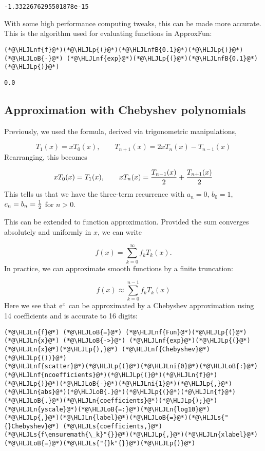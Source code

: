 \documentclass[12pt,a4paper]{article}
\newcommand{\HLJLn}[1]{#1}
\newcommand{\HLJLnf}[1]{\textcolor[RGB]{66,102,213}{#1}}
\newcommand{\HLJLs}[1]{\textcolor[RGB]{201,61,57}{#1}}
\newcommand{\HLJLnfB}[1]{\textcolor[RGB]{59,151,46}{#1}}
\newcommand{\HLJLni}[1]{\textcolor[RGB]{59,151,46}{#1}}
\newcommand{\HLJLoB}[1]{\textcolor[RGB]{102,102,102}{\textbf{#1}}}
\newcommand{\HLJLp}[1]{#1}
\def\E{ {\rm e} }
\begin{document}
\begin{lstlisting}
-1.3322676295501878e-15
\end{lstlisting}


With some high performance computing tweaks, this can be made more accurate. This is the algorithm used for evaluating functions in ApproxFun:


\begin{lstlisting}
(*@\HLJLnf{f}@*)(*@\HLJLp{(}@*)(*@\HLJLnfB{0.1}@*)(*@\HLJLp{)}@*) (*@\HLJLoB{-}@*) (*@\HLJLnf{exp}@*)(*@\HLJLp{(}@*)(*@\HLJLnfB{0.1}@*)(*@\HLJLp{)}@*)
\end{lstlisting}

\begin{lstlisting}
0.0
\end{lstlisting}


\subsection{Approximation with Chebyshev polynomials}
Previously, we used the formula, derived via trigonometric manipulations,

\[
T_1(x) = x T_0(x), \qquad
T_{n+1}(x) = 2x T_n(x) - T_{n-1}(x)
\]
Rearranging, this becomes

\[
 x T_0(x) = T_1(x), \qquad
x T_n(x)  =  {T_{n-1}(x) \over 2} + {T_{n+1}(x) \over 2}
\]
This tells us that we have the three-term recurrence with $a_n = 0$, $b_0 = 1$, $c_n = b_n = {1 \over 2}$ for $n > 0$.

This can be extended to function approximation. Provided the sum converges absolutely and uniformly in $x$, we can write

\[
f(x) = \sum_{k=0}^\infty f_k T_k(x).
\]
In practice, we can approximate smooth functions by a finite truncation:

\[
f(x) \approx \sum_{k=0}^{n-1} f_k T_k(x)
\]
Here we see that $\E^x$ can be approximated by a Chebyshev approximation using 14 coefficients and is accurate to 16 digits:


\begin{lstlisting}
(*@\HLJLn{f}@*) (*@\HLJLoB{=}@*) (*@\HLJLnf{Fun}@*)(*@\HLJLp{(}@*)(*@\HLJLn{x}@*) (*@\HLJLoB{->}@*) (*@\HLJLnf{exp}@*)(*@\HLJLp{(}@*)(*@\HLJLn{x}@*)(*@\HLJLp{),}@*) (*@\HLJLnf{Chebyshev}@*)(*@\HLJLp{())}@*)
(*@\HLJLnf{scatter}@*)(*@\HLJLp{(}@*)(*@\HLJLni{0}@*)(*@\HLJLoB{:}@*)(*@\HLJLnf{ncoefficients}@*)(*@\HLJLp{(}@*)(*@\HLJLn{f}@*)(*@\HLJLp{)}@*)(*@\HLJLoB{-}@*)(*@\HLJLni{1}@*)(*@\HLJLp{,}@*)(*@\HLJLn{abs}@*)(*@\HLJLoB{.}@*)(*@\HLJLp{(}@*)(*@\HLJLn{f}@*)(*@\HLJLoB{.}@*)(*@\HLJLn{coefficients}@*)(*@\HLJLp{);}@*)(*@\HLJLn{yscale}@*)(*@\HLJLoB{=:}@*)(*@\HLJLn{log10}@*)(*@\HLJLp{,}@*)(*@\HLJLn{label}@*)(*@\HLJLoB{=}@*)(*@\HLJLs{"{}Chebyshev}@*) (*@\HLJLs{coefficients,}@*) (*@\HLJLs{f\ensuremath{\_k}"{}}@*)(*@\HLJLp{,}@*)(*@\HLJLn{xlabel}@*)(*@\HLJLoB{=}@*)(*@\HLJLs{"{}k"{}}@*)(*@\HLJLp{)}@*)
\end{lstlisting}
\end{document}

